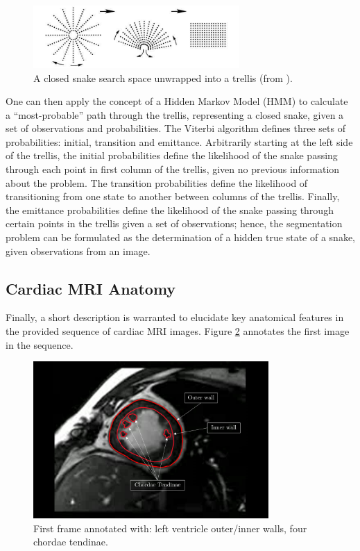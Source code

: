\begin{figure}[ht]
  \centering
  \includegraphics[width=0.7\textwidth]{images/q1_trellis.png}
  \caption{A closed snake search space unwrapped into a trellis (from \cite{biswas_2007}).}
  \label{fig:trellis}
\end{figure}

One can then apply the concept of a Hidden Markov Model (HMM) to calculate a ``most-probable'' path through the trellis, representing a closed snake, given a set of observations and probabilities. The Viterbi algorithm defines three sets of probabilities: initial, transition and emittance. Arbitrarily starting at the left side of the trellis, the initial probabilities define the likelihood of the snake passing through each point in first column of the trellis, given no previous information about the problem. The transition probabilities define the likelihood of transitioning from one state to another between columns of the trellis. Finally, the emittance probabilities define the likelihood of the snake passing through certain points in the trellis given a set of observations; hence, the segmentation problem can be formulated as the determination of a hidden true state of a snake, given observations from an image.

\subsection{Cardiac MRI Anatomy}

Finally, a short description is warranted to elucidate key anatomical features in the provided sequence of cardiac MRI images. Figure \ref{fig:cardiac_anatomy} annotates the first image in the sequence.

\begin{figure}[ht]
  \centering
  \includegraphics[width=0.8\textwidth]{images/q1_cardiac_anatomy.png}
  \caption{First frame annotated with: left ventricle outer/inner walls, four chordae tendinae.}
  \label{fig:cardiac_anatomy}
\end{figure}

